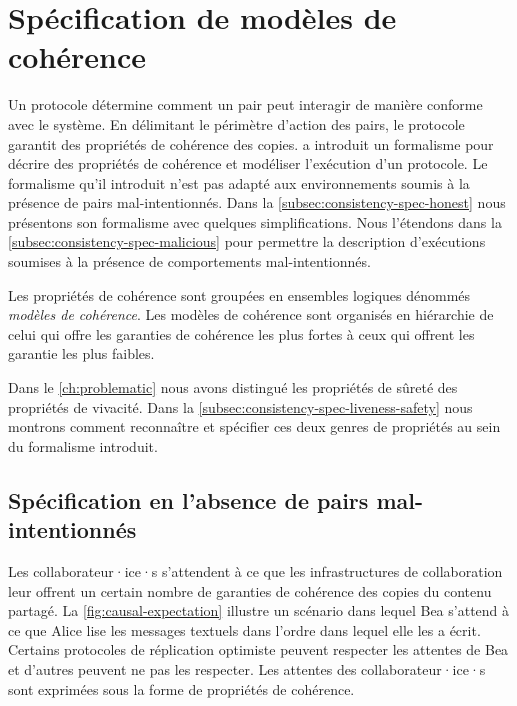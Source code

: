 \section{Spécification de modèles de cohérence}\label{sec:consistency-spec}

Un protocole détermine comment un pair peut interagir de manière conforme avec le système.
En délimitant le périmètre d'action des pairs, le protocole garantit des propriétés de cohérence des copies.
\textcite{burckhardt_eventualconsistency_2014} a introduit un formalisme pour décrire des propriétés de cohérence et modéliser l'exécution d'un protocole.
Le formalisme qu'il introduit n'est pas adapté aux environnements soumis à la présence de pairs mal-intentionnés.
Dans la \autoref{subsec:consistency-spec-honest} nous présentons son formalisme avec quelques simplifications.
Nous l'étendons dans la \autoref{subsec:consistency-spec-malicious} pour permettre la description d'exécutions soumises à la présence de comportements mal-intentionnés.

Les propriétés de cohérence sont groupées en ensembles logiques dénommés \emph{modèles de cohérence}.
Les modèles de cohérence sont organisés en hiérarchie de celui qui offre les garanties de cohérence les plus fortes à ceux qui offrent les garantie les plus faibles.

Dans le \autoref{ch:problematic} nous avons distingué les propriétés de sûreté des propriétés de vivacité.
Dans la \autoref{subsec:consistency-spec-liveness-safety} nous montrons comment reconnaître et spécifier ces deux genres de propriétés au sein du formalisme introduit.


\subsection{Spécification en l'absence de pairs mal-intentionnés}\label{subsec:consistency-spec-honest}

Les collaborateur·ice·s s'attendent à ce que les infrastructures de collaboration leur offrent un certain nombre de garanties de cohérence des copies du contenu partagé.
La \autoref{fig:causal-expectation} illustre un scénario dans lequel Bea s'attend à ce que Alice lise les messages textuels dans l'ordre dans lequel elle les a écrit.
Certains protocoles de réplication optimiste peuvent respecter les attentes de Bea et d'autres peuvent ne pas les respecter.
Les attentes des collaborateur·ice·s sont exprimées sous la forme de propriétés de cohérence.

